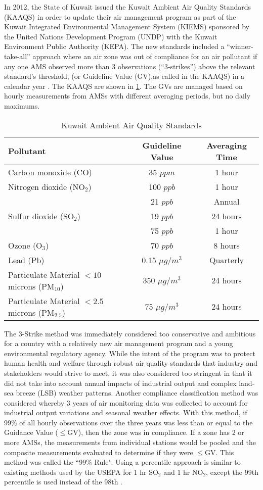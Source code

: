 In 2012, the State of Kuwait issued the Kuwait Ambient Air Quality Standards (KAAQS) in order to update their air management program as part of the Kuwait Integrated Environmental Management System (KIEMS) sponsored by the United Nations Development Program (UNDP) with the Kuwait Environment Public Authority (KEPA). The new standards included a ``winner-take-all” approach where an air zone was out of compliance for an air pollutant if any one AMS observed more than 3 observations (``3-strikes”) above the relevant standard’s threshold,  (or Guideline Value (GV),as called in the KAAQS) in a calendar year \citep{KEPA2017}. The KAAQS are shown in \ref{tb:1kaaqs}. The GVs are managed based on hourly measurements from AMSs with different averaging periods, but no daily maximums.
%
\begin{table}[H]
\centering
\caption{Kuwait Ambient Air Quality Standards}
\label{tb:1kaaqs}
\begin{tabular}{@{}lcc@{}}
\toprule
\textbf{Pollutant} & \textbf{Guideline Value} & \textbf{Averaging Time} \\ \midrule
Carbon monoxide (CO) & 35 $ppm$ & 1 hour \\
Nitrogen dioxide (NO$_{2}$) & 100 $ppb$ & 1 hour \\
 & 21 $ppb$ & Annual \\
Sulfur dioxide (SO$_{2}$) & 19 $ppb$ & 24 hours \\
 & 75 $ppb$ & 1 hour \\
Ozone (O$_{3}$) & 70 $ppb$ & 8 hours \\
Lead (Pb) & 0.15 $\mu g/m^{3}$ & Quarterly \\
Particulate Material $<10$ microns (PM$_{10}$) & 350 $\mu g/m^{3}$ & 24 hours \\
Particulate Material $<2.5$ microns (PM$_{2.5}$) & 75 $\mu g/m^{3}$ & 24 hours \\ \bottomrule
\end{tabular}
\end{table}
%
The 3-Strike method was immediately considered too conservative and ambitious for a country with a relatively new air management program and a young environmental regulatory agency. While the intent of the program was to protect human health and welfare through robust air quality standards that industry and stakeholders would strive to meet, it was also considered too stringent in that it did not take into account annual impacts of industrial output and complex land-sea breeze (LSB) weather patterns. Another compliance classification method was considered whereby 3 years of air monitoring data was collected to account for industrial output variations and seasonal weather effects. With this method, if 99\% of all hourly observations over the three years was less than or equal to the Guidance Value ($\leq$GV), then the zone was in compliance. If a zone has 2 or more AMSs, the measurements from individual stations would be pooled and the composite measurements evaluated to determine if they were $\leq$GV. This method was called the ``99\% Rule". Using a percentile approach is similar to existing methods used by the USEPA for 1 hr SO$_{2}$ and 1 hr NO$_{2}$, except the 99th percentile is used instead of the 98th \citep{USEPA2016a}.
